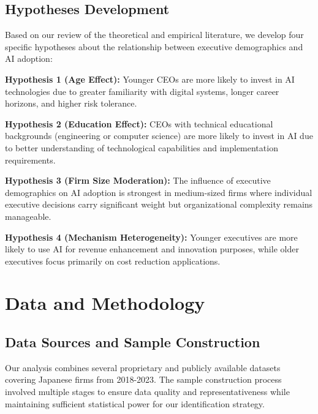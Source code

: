 \documentclass[12pt, a4paper]{article}
\begin{document}
\subsection{Hypotheses Development}

Based on our review of the theoretical and empirical literature, we develop four specific hypotheses about the relationship between executive demographics and AI adoption:

\textbf{Hypothesis 1 (Age Effect):} Younger CEOs are more likely to invest in AI technologies due to greater familiarity with digital systems, longer career horizons, and higher risk tolerance.

\textbf{Hypothesis 2 (Education Effect):} CEOs with technical educational backgrounds (engineering or computer science) are more likely to invest in AI due to better understanding of technological capabilities and implementation requirements.

\textbf{Hypothesis 3 (Firm Size Moderation):} The influence of executive demographics on AI adoption is strongest in medium-sized firms where individual executive decisions carry significant weight but organizational complexity remains manageable.

\textbf{Hypothesis 4 (Mechanism Heterogeneity):} Younger executives are more likely to use AI for revenue enhancement and innovation purposes, while older executives focus primarily on cost reduction applications.

\section{Data and Methodology}

\subsection{Data Sources and Sample Construction}

Our analysis combines several proprietary and publicly available datasets covering Japanese firms from 2018-2023. The sample construction process involved multiple stages to ensure data quality and representativeness while maintaining sufficient statistical power for our identification strategy.
\end{document}
